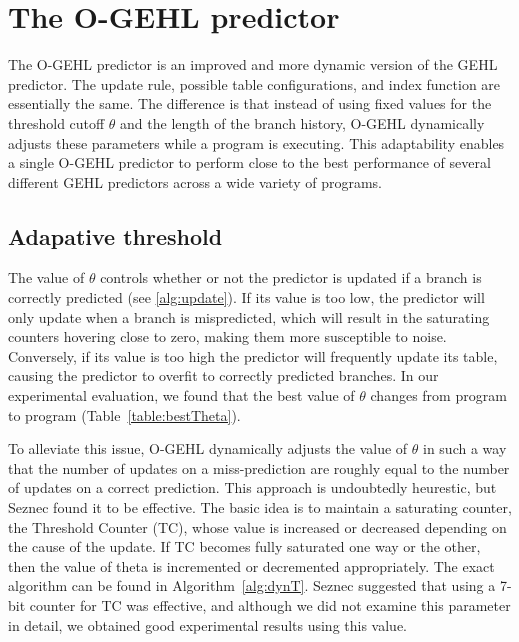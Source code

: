 \section{The O-GEHL predictor}
The O-GEHL predictor is an improved and more dynamic version of the GEHL predictor.  The update rule, possible table configurations, and index function are essentially the same.  The difference is that instead of using fixed values for the threshold cutoff $\theta$ and the length of the branch history, O-GEHL dynamically adjusts these parameters while a program is executing.  This adaptability enables a single O-GEHL predictor to perform close to the best performance of several different GEHL predictors across a wide variety of programs.

\subsection{Adapative threshold}
\label{sec:adaptT}
The value of $\theta$ controls whether or not the predictor is updated if a branch is correctly predicted (see \ref{alg:update}).  If its value is too low, the predictor will only update when a branch is mispredicted, which will result in the saturating counters hovering close to zero, making them more susceptible to noise. Conversely, if its value is too high the predictor will frequently update its table, causing the predictor to overfit to correctly predicted branches.  In our experimental evaluation, we found that the best value of $\theta$ changes from program to program (Table~\ref{table:bestTheta}).

To alleviate this issue, O-GEHL dynamically adjusts the value of $\theta$ in such a way that the number of updates on a miss-prediction are roughly equal to the number of updates on a correct prediction.  This approach is undoubtedly heurestic, but Seznec found it to be effective.\cite{seznec2005analysis}\cite{ogehl}  The basic idea is to maintain a saturating counter, the Threshold Counter (TC), whose value is increased or decreased depending on the cause of the update.  If TC becomes fully saturated one way or the other, then the value of theta is incremented or decremented appropriately.  The exact algorithm can be found in Algorithm~\ref{alg:dynT}.  Seznec suggested that using a 7-bit counter for TC was effective, and although we did not examine this parameter in detail, we obtained good experimental results using this value.

